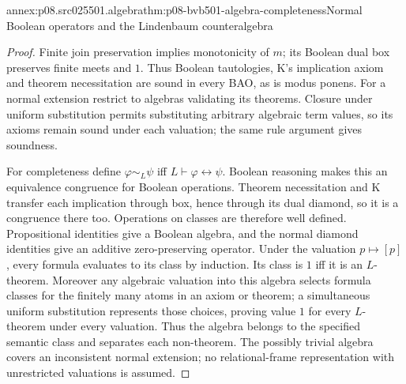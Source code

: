 \begin{annexitem}{annex:p08.src025501.algebra}{thm:p08-bvb501-algebra-completeness}{Normal Boolean operators and the Lindenbaum counteralgebra}
\begin{proof}
Finite join preservation implies monotonicity of \(m\); its Boolean
dual box preserves finite meets and \(1\). Thus Boolean tautologies,
K's implication axiom and theorem necessitation are sound in every
BAO, as is modus ponens. For a normal extension restrict to algebras
validating its theorems. Closure under uniform substitution permits
substituting arbitrary algebraic term values, so its axioms remain
sound under each valuation; the same rule argument gives soundness.

For completeness define \(\varphi\sim_L\psi\) iff
\(L\vdash\varphi\leftrightarrow\psi\). Boolean reasoning
makes this an equivalence congruence for Boolean operations. Theorem
necessitation and K transfer each implication through box, hence through
its dual diamond, so it is a congruence there too. Operations on
classes are therefore well defined. Propositional identities give a
Boolean algebra, and the normal diamond identities give an additive
zero-preserving operator. Under the valuation \(p\mapsto[p]\),
every formula evaluates to its class by induction. Its class is \(1\)
iff it is an \(L\)-theorem. Moreover any algebraic valuation into
this algebra selects formula classes for the finitely many atoms in
an axiom or theorem; a simultaneous uniform substitution represents
those choices, proving value \(1\) for every \(L\)-theorem
under every valuation. Thus the algebra belongs to the specified
semantic class and separates each non-theorem. The possibly trivial
algebra covers an inconsistent normal extension; no relational-frame
representation with unrestricted valuations is assumed.
\end{proof}
\end{annexitem}

